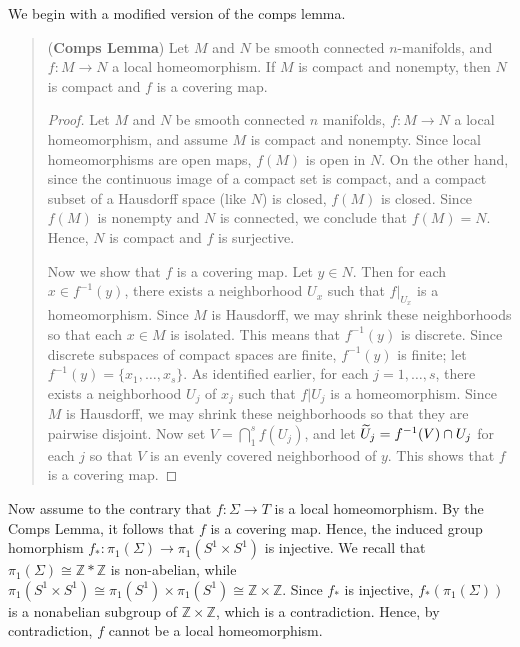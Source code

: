 \documentclass{article}
\begin{document}
\begin{solutions}
	We begin with a modified version of the comps lemma. 
		\begin{quote}
			(\textbf{Comps Lemma}) Let $M$ and $N$ be smooth connected $n$-manifolds, and $f: M \to N$ a local homeomorphism. If $M$ is compact and nonempty, then $N$ is compact and $f$ is a covering map. 
			
			\begin{proof}
				Let $M$ and $N$ be smooth connected $n$ manifolds, $f: M \to N$ a local homeomorphism, and assume $M$ is compact and nonempty. Since local homeomorphisms are open maps, $f(M)$ is open in $N$. On the other hand, since the continuous image of a compact set is compact, and a compact subset of a Hausdorff space (like $N$) is closed, $f(M)$ is closed. Since $f(M)$ is nonempty and $N$ is connected, we conclude that $f(M) = N$. Hence, $N$ is compact and $f$ is surjective. 
				
				Now we show that $f$ is a covering map. Let $y \in N$. Then for each $x \in f^{-1}(y)$, there exists a neighborhood $U_{x}$ such that $f|_{U_{x}}$ is a homeomorphism. Since $M$ is Hausdorff, we may shrink these neighborhoods so that each $x \in M$ is isolated. This means that $f^{-1}(y)$ is discrete. Since discrete subspaces of compact spaces are finite, $f^{-1}(y)$ is finite; let $f^{-1}(y) = \{x_{1}, \ldots, x_{s}\}$. As identified earlier, for each $j = 1, \ldots, s$, there exists a neighborhood $U_{j}$ of $x_{j}$ such that $f|U_{j}$ is a homeomorphism. Since $M$ is Hausdorff, we may shrink these neighborhoods so that they are pairwise disjoint. Now set $V = \bigcap_{1}^{s}f(U_{j})$, and let $\widetilde{U}_{j} = f^{-1}(V) \cap U_{j}$ for each $j$ so that $V$ is an evenly covered neighborhood of $y$. This shows that $f$ is a covering map. 
			\end{proof} 
		\end{quote} 
	
	Now assume to the contrary that $f: \Sigma \to T$ is a local homeomorphism. By the Comps Lemma, it follows that $f$ is a covering map. Hence, the induced group homorphism $f_{\ast}: \pi_{1}(\Sigma) \to \pi_{1}(S^{1}\times S^{1})$ is injective. We recall that $\pi_{1}(\Sigma) \cong \mathbb{Z} \ast \mathbb{Z}$ is non-abelian, while $\pi_{1}(S^{1} \times S^{1}) \cong \pi_{1}(S^{1}) \times \pi_{1}(S^{1}) \cong \mathbb{Z} \times \mathbb{Z}$. Since $f_{\ast}$ is injective, $f_{\ast}(\pi_{1}(\Sigma))$ is a nonabelian subgroup of $\mathbb{Z} \times \mathbb{Z}$, which is a contradiction. Hence, by contradiction, $f$ cannot be a local homeomorphism. 
\end{solutions}
\end{document}
